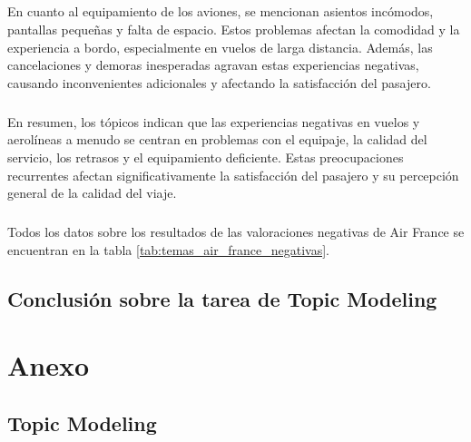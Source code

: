\documentclass{report}
\begin{document}
{{                    \paragraph*{}{
                        En cuanto al equipamiento de los aviones, se mencionan asientos incómodos, pantallas pequeñas y falta de espacio. Estos problemas afectan la comodidad y la experiencia a bordo, especialmente en vuelos de larga distancia. Además, las cancelaciones y demoras inesperadas agravan estas experiencias negativas, causando inconvenientes adicionales y afectando la satisfacción del pasajero.
                    }
                    \paragraph*{}{
                        En resumen, los tópicos indican que las experiencias negativas en vuelos y aerolíneas a menudo se centran en problemas con el equipaje, la calidad del servicio, los retrasos y el equipamiento deficiente. Estas preocupaciones recurrentes afectan significativamente la satisfacción del pasajero y su percepción general de la calidad del viaje.
                    }
                    \paragraph*{}{
                        Todos los datos sobre los resultados de las valoraciones negativas de Air France se encuentran en la tabla \ref{tab:temas_air_france_negativas}.
                    }
        \clearpage\section{Conclusión sobre la tarea de Topic Modeling}
    \chapter{Anexo}
        \section{Topic Modeling}
}}
\end{document}
